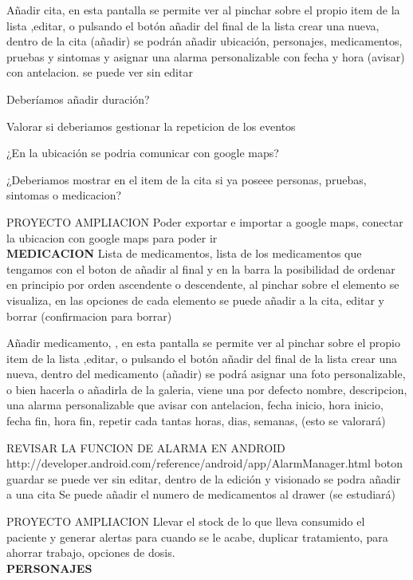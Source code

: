 \documentclass[../pfc.tex]{subfiles}
\begin{document}
	Añadir cita, en esta pantalla se permite ver al pinchar sobre el propio item de la lista ,editar, o pulsando el botón añadir del final de la lista crear una nueva, 
	dentro de la cita (añadir) se podrán añadir ubicación, personajes, medicamentos, pruebas y sintomas y asignar una alarma personalizable con fecha y hora (avisar) con antelacion.
	se puede ver sin editar
	
	Deberíamos añadir duración?
	
	Valorar si deberiamos gestionar la repeticion de los eventos
	
	¿En la ubicación se podria comunicar con google maps?
	
	¿Deberiamos mostrar en el item de la cita si ya poseee personas, pruebas, sintomas o medicacion?
	
	PROYECTO AMPLIACION Poder exportar e importar a google maps, conectar la ubicacion con google maps para poder ir\\
	
	
	\textbf{MEDICACION}
	Lista de medicamentos, lista de los medicamentos que tengamos con el boton de añadir al final y en la barra la posibilidad de ordenar en principio por orden ascendente o descendente,
	al pinchar sobre el elemento se visualiza, en las opciones de cada elemento se puede añadir a la cita, editar y borrar (confirmacion para borrar)
	
	Añadir medicamento, , en esta pantalla se permite ver al pinchar sobre el propio item de la lista ,editar, o pulsando el botón añadir del final de la lista crear una nueva, 
	dentro del medicamento (añadir) se podrá asignar una foto personalizable, o bien hacerla o añadirla de la galeria, viene una por defecto
	nombre, descripcion, 
	una alarma personalizable que avisar con antelacion, fecha inicio, hora inicio, fecha fin, hora fin, repetir cada tantas horas, dias, semanas, (esto se valorará)

	REVISAR LA FUNCION DE ALARMA EN ANDROID http://developer.android.com/reference/android/app/AlarmManager.html
	boton guardar 
	se puede ver sin editar, 
	dentro de la edición y visionado se podra añadir a una cita
	Se puede añadir el numero de medicamentos al drawer (se estudiará)
	
	PROYECTO AMPLIACION Llevar el stock de lo que lleva consumido el paciente y generar alertas para cuando se le acabe, duplicar tratamiento, para ahorrar trabajo, opciones de dosis.\\
	
	
\textbf{PERSONAJES}
	
\end{document}
